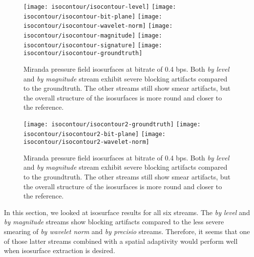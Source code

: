 \begin{figure}[h]
	\centering
	{\texttt{[image: isocontour/isocontour-level]}}
	{\texttt{[image: isocontour/isocontour-bit-plane]}}
	{\texttt{[image: isocontour/isocontour-wavelet-norm]}}
	{\texttt{[image: isocontour/isocontour-magnitude]}}
	{\texttt{[image: isocontour/isocontour-signature]}}
	{\texttt{[image: isocontour/isocontour-groundtruth]}}
	\caption{Miranda pressure field isosurfaces at bitrate of 0.4 bps. Both {\em by level}
        and {\em by magnitude} stream exhibit severe blocking artifacts compared to the groundtruth. The other streams
        still show smear artifacts, but the overall structure of the isosurfaces is more round and closer to the
        reference.}
	\label{fig:isocontour-surfaces}
\end{figure}

\begin{figure}[h]
	\centering
	{\texttt{[image: isocontour/isocontour2-groundtruth]}}
	{\texttt{[image: isocontour/isocontour2-bit-plane]}}
	{\texttt{[image: isocontour/isocontour2-wavelet-norm]}}
	\caption{Miranda pressure field isosurfaces at bitrate of 0.4 bps. Both {\em by level}
        and {\em by magnitude} stream exhibit severe blocking artifacts compared to the groundtruth. The other streams
        still show smear artifacts, but the overall structure of the isosurfaces is more round and closer to the
        reference.}
	\label{fig:isocontour-surfaces}
\end{figure}



In this section, we looked at isosurface results for all six streams. The {\em by level} and {\em by magnitude} streams
show blocking artifacts compared to the less severe smearing of {\em by wavelet norm} and {\em by precisio} streams. Therefore,
it seems that one of those latter streams combined with a spatial adaptivity would perform well when isosurface
extraction is desired.
